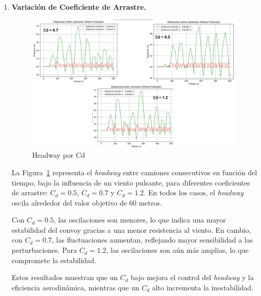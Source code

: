 \documentclass[11pt,stdletter,orderfromtodate,sigleft,twoside]{report}
\begin{document}
\begin{enumerate}
    \item \textbf{Variación de Coeficiente de Arrastre.}

    \begin{figure}[H]
    \centering
    \includegraphics[width=0.75\linewidth]{figures//Cars/posicion cambio cd pulsante.png}
    \caption{Headway por Cd}
    \label{fig:headway_cd}
\end{figure}

La Figura~\ref{fig:headway_cd} representa el \textit{headway} entre camiones consecutivos en función del tiempo, bajo la influencia de un viento pulsante, para diferentes coeficientes de arrastre: $C_d = 0.5$, $C_d = 0.7$ y $C_d = 1.2$. En todos los casos, el \textit{headway} oscila alrededor del valor objetivo de 60 metros.

Con $C_d = 0.5$, las oscilaciones son menores, lo que indica una mayor estabilidad del convoy gracias a una menor resistencia al viento. En cambio, con $C_d = 0.7$, las fluctuaciones aumentan, reflejando mayor sensibilidad a las perturbaciones. Para $C_d = 1.2$, las oscilaciones son aún más amplias, lo que compromete la estabilidad.

Estos resultados muestran que un $C_d$ bajo mejora el control del \textit{headway} y la eficiencia aerodinámica, mientras que un $C_d$ alto incrementa la inestabilidad.



\end{enumerate}
\end{document}
